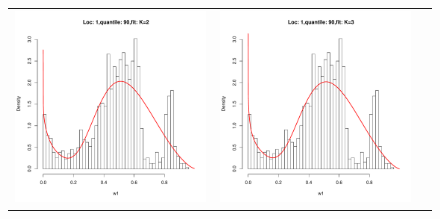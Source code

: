 \begin{figure}[h]
\begin{tabular}{ccc}
\includegraphics[width=\textwidth/3]{../img/loc1/quantile90/fit_K2.pdf}
&
\includegraphics[width=\textwidth/3]{../img/loc1/quantile90/fit_K3.pdf}\\



\end{tabular}
\end{figure}
